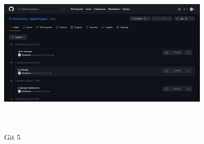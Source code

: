\documentclass[12pt]{report}
\begin{document}
\begin{figure}[htbp]
  \centering
  \includegraphics [width=0.9\textwidth, height=8cm]{git 5.png}
  \caption{Git 5}
  \label{fig:image}
\end{figure}
\end{document}
